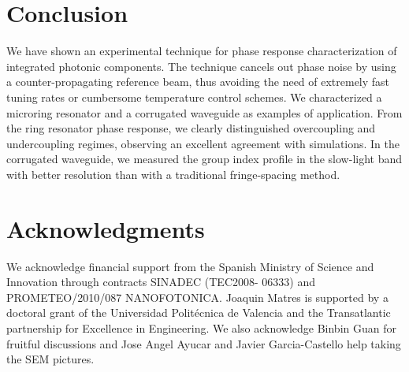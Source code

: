 \documentclass[journal]{IEEEtran}
\begin{document}

\section{Conclusion}
We have shown an experimental technique for phase response characterization of integrated photonic components.
The technique cancels out phase noise by using a counter-propagating reference beam, thus avoiding the need of extremely fast tuning rates or cumbersome temperature control schemes.
We characterized a microring resonator and a corrugated waveguide as examples of application.
From the ring resonator phase response, we clearly distinguished overcoupling and undercoupling regimes, observing an excellent agreement with simulations.
In the corrugated waveguide, we measured the group index profile in the slow-light band with better resolution than with a traditional fringe-spacing method.



\section*{Acknowledgments}
We acknowledge financial support from the Spanish Ministry of Science and Innovation through contracts SINADEC (TEC2008- 06333) and PROMETEO/2010/087 NANOFOTONICA. Joaquin Matres is supported by a doctoral grant of the Universidad Polit\'ecnica de Valencia and the Transatlantic partnership for Excellence in Engineering. We also acknowledge Binbin Guan for fruitful discussions and Jose Angel Ayucar and Javier Garcia-Castello help taking the SEM pictures.



% 
% 
\end{document}

